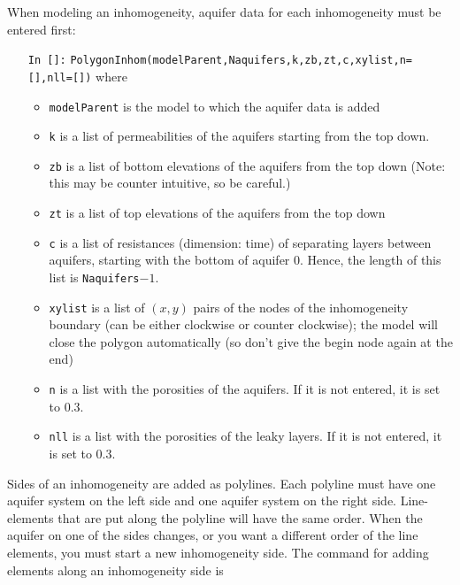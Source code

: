 \documentclass [10pt,letterpaper] {article}
\begin{document}
When modeling an inhomogeneity,
aquifer data for each inhomogeneity must be entered first:
\begin{itemize}
\item[{\tt In []:}] {\tt PolygonInhom(modelParent,Naquifers,k,zb,zt,c,xylist,n=[],nll=[])} where
    \begin{itemize}
    \item {\tt modelParent} is the model to which the aquifer data is
    added
    \item {\tt k} is a list of permeabilities of the aquifers starting
    from the top down.
    \item {\tt zb} is a list of bottom elevations of the aquifers
    from the top down (Note: this may be counter intuitive, so be
    careful.)
    \item {\tt zt} is a list of top elevations of the aquifers
    from the top down
    \item {\tt c} is a list of resistances (dimension: time) of separating layers
    between aquifers, starting with the bottom of aquifer 0. Hence, the
    length of this list is {\tt Naquifers}$-1$.
    \item {\tt xylist} is a list of $(x,y)$ pairs of the nodes of
    the inhomogeneity boundary (can be either clockwise or counter clockwise); the model will close the
    polygon automatically (so don't give the begin node again at
    the end)
    \item {\tt n} is a list with the porosities of the aquifers. If it is not entered, it is set to 0.3.
    \item {\tt nll} is a list with the porosities of the leaky layers. If it is not entered, it is set to 0.3.
    \end{itemize}
\end{itemize}
Sides of an inhomogeneity are added as polylines. Each polyline must have one
     aquifer system on the left side and one aquifer system on the right side. Line-elements that
are put along the polyline will have the same order. When the aquifer on one of
the sides changes, or you want a different order of the line elements, you must
start a new inhomogeneity side. The command for adding elements along an
inhomogeneity side is
\end{document}
